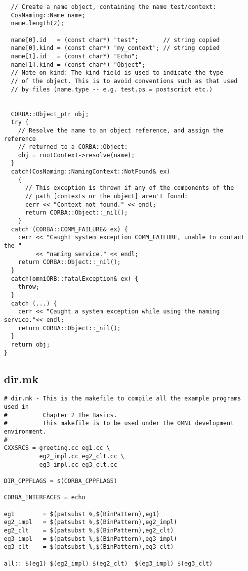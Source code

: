 \documentclass[11pt,twoside,onecolumn]{book}
\begin{document}
{\begin{verbatim}
  // Create a name object, containing the name test/context:
  CosNaming::Name name;
  name.length(2);

  name[0].id   = (const char*) "test";       // string copied
  name[0].kind = (const char*) "my_context"; // string copied
  name[1].id   = (const char*) "Echo";
  name[1].kind = (const char*) "Object";
  // Note on kind: The kind field is used to indicate the type
  // of the object. This is to avoid conventions such as that used
  // by files (name.type -- e.g. test.ps = postscript etc.)

  
  CORBA::Object_ptr obj;
  try {
    // Resolve the name to an object reference, and assign the reference 
    // returned to a CORBA::Object:
    obj = rootContext->resolve(name);
  }
  catch(CosNaming::NamingContext::NotFound& ex)
    {
      // This exception is thrown if any of the components of the
      // path [contexts or the object] aren't found:
      cerr << "Context not found." << endl;
      return CORBA::Object::_nil();
    }
  catch (CORBA::COMM_FAILURE& ex) {
    cerr << "Caught system exception COMM_FAILURE, unable to contact the "
         << "naming service." << endl;
    return CORBA::Object::_nil();
  }
  catch(omniORB::fatalException& ex) {
    throw;
  }
  catch (...) {
    cerr << "Caught a system exception while using the naming service."<< endl;
    return CORBA::Object::_nil();
  }
  return obj;
}
\end{verbatim}
\newpage


\newpage
\subsection{dir.mk}
\begin{verbatim}
# dir.mk - This is the makefile to compile all the example programs used in
#          Chapter 2 The Basics.
#          This makefile is to be used under the OMNI development environment.
#
CXXSRCS = greeting.cc eg1.cc \
          eg2_impl.cc eg2_clt.cc \
          eg3_impl.cc eg3_clt.cc

DIR_CPPFLAGS = $(CORBA_CPPFLAGS)

CORBA_INTERFACES = echo

eg1        = $(patsubst %,$(BinPattern),eg1)
eg2_impl   = $(patsubst %,$(BinPattern),eg2_impl)
eg2_clt    = $(patsubst %,$(BinPattern),eg2_clt)
eg3_impl   = $(patsubst %,$(BinPattern),eg3_impl)
eg3_clt    = $(patsubst %,$(BinPattern),eg3_clt)

all:: $(eg1) $(eg2_impl) $(eg2_clt)  $(eg3_impl) $(eg3_clt)


\end{verbatim}}
\end{document}
